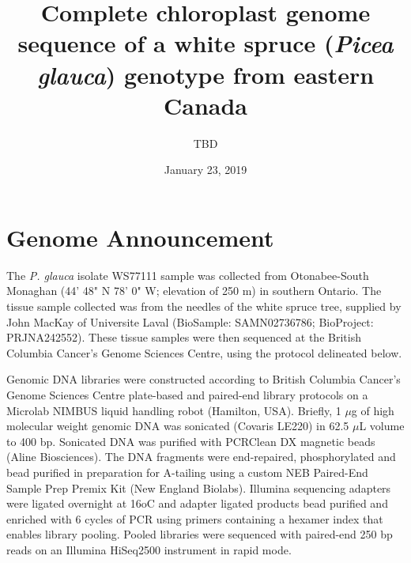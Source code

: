 \documentclass[titlepage,11pt, oneside]{article}   	%
\title{\textbf{Complete chloroplast genome sequence of a white spruce (\textit{Picea glauca}) genotype from eastern Canada}}
\author{TBD}
\date{January 23, 2019}					%
\begin{document}
\maketitle

\section*{Genome Announcement}
The \textit{P. glauca} isolate WS77111 sample was collected from Otonabee-South Monaghan (44' 48" N 78' 0" W; elevation of 250 m) in southern Ontario. The tissue sample collected was from the needles of the white spruce tree, supplied by John MacKay of Universite Laval (BioSample: SAMN02736786; BioProject: PRJNA242552). These tissue samples were then sequenced at the British Columbia Cancer's Genome Sciences Centre, using the protocol delineated below.

Genomic DNA libraries were constructed according to British Columbia Cancer’s Genome Sciences Centre plate-based and paired-end library protocols on a Microlab NIMBUS liquid handling robot (Hamilton, USA). Briefly, 1 $\mu$g of high molecular weight genomic DNA was sonicated (Covaris LE220) in 62.5 $\mu$L volume to 400 bp. Sonicated DNA was purified with PCRClean DX magnetic beads (Aline Biosciences). The DNA fragments were end-repaired, phosphorylated and bead purified in preparation for A-tailing using a custom NEB Paired-End Sample Prep Premix Kit (New England Biolabs).  Illumina sequencing adapters were ligated overnight at 16oC and adapter ligated products bead purified and enriched with 6 cycles of PCR using primers containing a hexamer index that enables library pooling. Pooled libraries were sequenced with paired-end 250 bp reads on an Illumina HiSeq2500 instrument in rapid mode.
\end{document}

